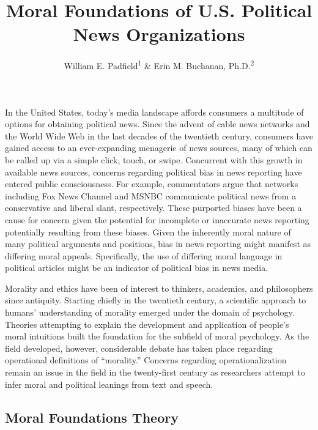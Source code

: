 \documentclass[english,,man]{apa6}
\title{Moral Foundations of U.S. Political News Organizations}
\author{William E. Padfield\textsuperscript{1} \& Erin M. Buchanan, Ph.D.\textsuperscript{2}}
\date{}
\affiliation{\vspace{0.5cm}\textsuperscript{1} Missouri State University\\\textsuperscript{2} Harrisburg University of Science and Technology}
\begin{document}
\maketitle

In the United States, today's media landscape affords consumers a multitude of options for obtaining political news. Since the advent of cable news networks and the World Wide Web in the last decades of the twentieth century, consumers have gained access to an ever-expanding menagerie of news sources, many of which can be called up via a simple click, touch, or swipe. Concurrent with this growth in available news sources, concerns regarding political bias in news reporting have entered public consciousness. For example, commentators argue that networks including Fox News Channel and MSNBC communicate political news from a conservative and liberal slant, respectively. These purported biases have been a cause for concern given the potential for incomplete or inaccurate news reporting potentially resulting from these biases. Given the inherently moral nature of many political arguments and positions, bias in news reporting might manifest as differing moral appeals. Specifically, the use of differing moral language in political articles might be an indicator of political bias in news media.

Morality and ethics have been of interest to thinkers, academics, and philosophers since antiquity. Starting chiefly in the twentieth century, a scientific approach to humans' understanding of morality emerged under the domain of psychology. Theories attempting to explain the development and application of people's moral intuitions built the foundation for the subfield of moral psychology. As the field developed, however, considerable debate has taken place regarding operational definitions of \enquote{morality.} Concerns regarding operationalization remain an issue in the field in the twenty-first century as researchers attempt to infer moral and political leanings from text and speech.

\hypertarget{moral-foundations-theory}{%
\subsection{Moral Foundations Theory}\label{moral-foundations-theory}}
\end{document}
